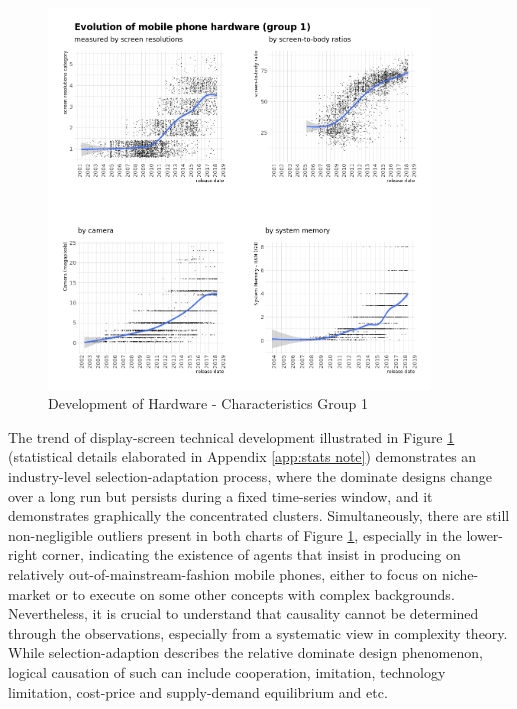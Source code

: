 \documentclass[utf8,english]{gradu3}
\begin{document}
\begin{figure}[htb]
    \centering
    \includegraphics[width=0.90\textwidth]{evo1.png}
    \caption{Development of Hardware - Characteristics Group 1}
    \label{fig:screen resolutions}
\end{figure}

The trend of display-screen technical development illustrated in Figure \ref{fig:screen resolutions} (statistical details elaborated in Appendix \ref{app:stats note}) demonstrates an industry-level selection-adaptation process, where the dominate designs change over a long run but persists during a fixed time-series window, and it demonstrates graphically the concentrated clusters. Simultaneously, there are still non-negligible outliers present in both charts of Figure \ref{fig:screen resolutions}, especially in the lower-right corner, indicating the existence of agents that insist in producing on relatively out-of-mainstream-fashion mobile phones, either to focus on niche-market or to execute on some other concepts with complex backgrounds. Nevertheless, it is crucial to understand that causality cannot be determined through the observations, especially from a systematic view in complexity theory. While selection-adaption describes the relative dominate design phenomenon, logical causation of such can include cooperation, imitation, technology limitation, cost-price and supply-demand equilibrium and etc. 
\end{document}
